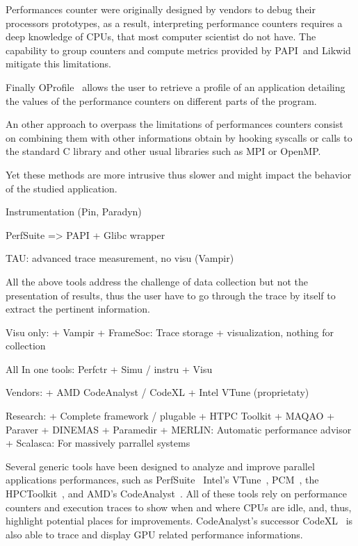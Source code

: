 
Performances counter were originally designed by vendors to debug their
processors prototypes, as a result, interpreting performance counters requires
a deep knowledge of \glspl{CPU}, that most computer scientist do not have. The
capability to group counters and compute metrics provided by \gls{PAPI} and
\gls{Likwid} mitigate this limitations.



Finally \gls{OProfile}~\cite{Oprofile}
allows the user to retrieve a profile of an application detailing the values
of the performance counters on different parts of the program.

An other approach to overpass the limitations of performances counters consist
on combining them with other informations obtain by hooking \glspl{syscall} or
calls to the standard C library and other usual libraries such as \gls{MPI} or
\gls{OpenMP}.

Yet these methods are more intrusive thus slower and might
impact the behavior of the studied application.



Instrumentation (Pin, Paradyn)

PerfSuite => PAPI + Glibc wrapper


TAU: advanced trace measurement, no visu (Vampir)


All the above tools address the challenge of data collection but not the
presentation of results, thus the user have to go through the trace by itself
to extract the pertinent information.


Visu only:
    + Vampir
    + FrameSoc: Trace storage + visualization, nothing for collection

All In one tools: Perfctr + Simu / instru + Visu

Vendors:
    + AMD CodeAnalyst / CodeXL
    + Intel VTune (proprietaty)

Research:
    + Complete framework / plugable
        + HTPC Toolkit
        + MAQAO
        + Paraver
            + DINEMAS
            + Paramedir
    + MERLIN: Automatic performance advisor
    + Scalasca: For massively parrallel systems

Several generic tools have been designed to analyze and improve parallel
applications performances, such as \gls{PerfSuite}~\cite{Kufrin05Perfsuite}
\gls{Intel}'s \gls{VTune}~\cite{Reinders05VTune},
\gls{PCM}~\cite{Wilhalm16Intel}, the
\gls{HPCToolkit}~\cite{Adhianto10HPCTOOLKIT}, and \gls{AMD}'s
\gls{CodeAnalyst}~\cite{Drongowski08introduction}. All of these tools rely on
performance counters and execution traces to show when and where CPUs are
idle, and, thus, highlight potential places for improvements.
\gls{CodeAnalyst}'s successor \gls{CodeXL}~\cite{AMDCodeXL} is also able to
trace and display \gls{GPU} related performance informations.

